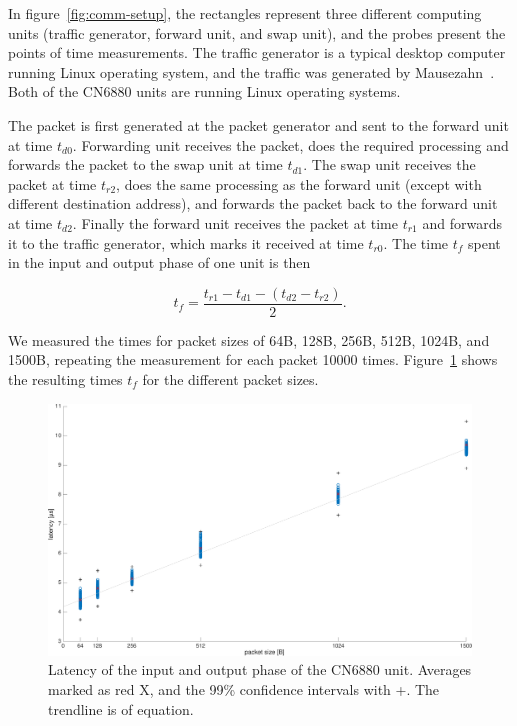 In figure~\ref{fig:comm-setup}, the rectangles represent three different computing units (traffic generator, forward unit, and swap unit), and the probes present the points of time measurements. The traffic generator is a typical desktop computer running Linux operating system, and the traffic was generated by Mausezahn~\cite{mausezahn}. Both of the CN6880 units are running Linux operating systems.

The packet is first generated at the packet generator and sent to the forward unit at time $t_{d0}$. Forwarding unit receives the packet, does the required processing and forwards the packet to the swap unit at time $t_{d1}$. The swap unit receives the packet at time $t_{r2}$, does the same processing as the forward unit (except with different destination address), and forwards the packet back to the forward unit at time $t_{d2}$. Finally the forward unit receives the packet at time $t_{r1}$ and forwards it to the traffic generator, which marks it received at time $t_{r0}$. The time $t_{f}$ spent in the input and output phase of one unit is then

\begin{equation}
  \label{eq:1}
  t_{f} = \frac{t_{r1} - t_{d1} - (t_{d2} - t_{r2})}{2}.
\end{equation}

We measured the times for packet sizes of 64B, 128B, 256B, 512B, 1024B, and 1500B, repeating the measurement for each packet 10000 times. Figure~\ref{fig:comm-latency} shows the resulting times $t_{f}$ for the different packet sizes.

\begin{figure}[]
  \begin{center}
    \includegraphics[width=\textwidth]{images/comm-latency.pdf}
    \caption{Latency of the input and output phase of the CN6880 unit. Averages marked as red X, and the 99\% confidence intervals with +. The trendline is of equation.}
    \label{fig:comm-latency}
  \end{center}
\end{figure}

